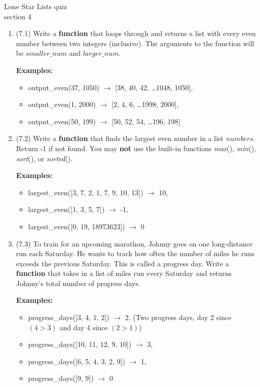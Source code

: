 \documentclass{article}
\begin{document}

Lone Star \hfill Lists quiz\\
section 4\\
\begin{enumerate}
\item (7.1) 
		Write a \textbf{function} that loops through and returns a list with every even number between two
		integers (inclusive). The arguments to the function will be $smaller\_num$ and 
		$larger\_num$.

		\textbf{Examples:}		
		\begin{itemize}
			\item  output\_even(37, 1050) $\rightarrow$ [38, 40, 42, \dots 1048, 1050], 
			\item  output\_even(1, 2000) $\rightarrow$ [2, 4, 6, \dots 1998, 2000], 
			\item  output\_even(50, 199) $\rightarrow$ [50, 52, 54, \dots 196, 198]
		\end{itemize}

\item (7.2) 
		Write a \textbf{function} that finds the largest even number in a list $numbers$. Return -1 if not found. 
		You may \textbf{not} use the built-in functions \textit{max}(), \textit{min}(), \textit{sort}(), or \textit{sorted}().

		\textbf{Examples:}		
		\begin{itemize}
			\item  largest\_even([3, 7, 2, 1, 7, 9, 10, 13]) $\rightarrow$ 10,
			\item  largest\_even([1, 3, 5, 7]) $\rightarrow$ -1,
			\item  largest\_even([0, 19, 18973623]) $\rightarrow$ 0
		\end{itemize}

\item (7.3)
		To train for an upcoming marathon, Johnny goes on one long-distance run each Saturday. 
		He wants to track how often the number of miles he runs exceeds the previous Saturday. 
		This is called a progress day. Write a \textbf{function} that takes in a list of miles 
		run every Saturday and returns Johnny's total number of progress days.

		\textbf{Examples:}		
		\begin{itemize}
			\item  progress\_days([3, 4, 1, 2]) $\rightarrow$ 2, 
				(Two progress days, day 2 since $(4>3)$ and day 4 since $(2>1)$)
			\item  progress\_days([10, 11, 12, 9, 10]) $\rightarrow$ 3, 
			\item  progress\_days([6, 5, 4, 3, 2, 9]) $\rightarrow$ 1, 
			\item  progress\_days([9, 9]) $\rightarrow$ 0
		\end{itemize}

\end{enumerate}
\end{document}
